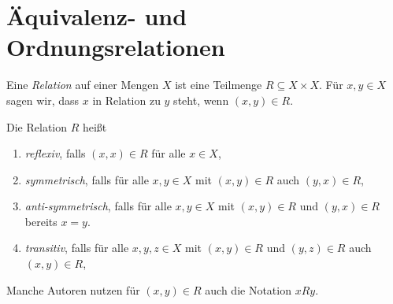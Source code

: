 \chapter{Äquivalenz- und Ordnungsrelationen}

\begin{defi}
 Eine \emph{Relation} auf einer Mengen $X$ ist eine Teilmenge $R \subseteq X \times X$. Für $x,y \in X$ sagen wir, dass $x$ in Relation zu $y$ steht, wenn $(x,y) \in R$.
 
 Die Relation $R$ heißt
 \begin{enumerate}[label=\roman*)]
  \item
   \emph{reflexiv}, falls $(x,x) \in R$ für alle $x \in X$,
  \item
   \emph{symmetrisch}, falls für alle $x,y \in X$ mit $(x,y) \in R$ auch $(y,x) \in R$,
  \item
   \emph{anti-symmetrisch}, falls für alle $x,y \in X$ mit $(x,y) \in R$ und $(y,x) \in R$ bereits $x=y$.
  \item
   \emph{transitiv}, falls für alle $x,y,z \in X$ mit $(x,y) \in R$ und $(y,z) \in R$ auch $(x,y) \in R$,
 \end{enumerate}
\end{defi}

\begin{bem}
 Manche Autoren nutzen für $(x,y) \in R$ auch die Notation $xRy$.
\end{bem}


